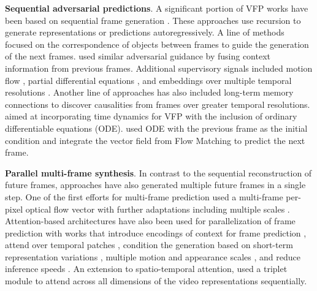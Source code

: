 \documentclass[smallextended,twocolumn,natbib]{svjour3}
\begin{document}
\noindent
\textbf{Sequential adversarial predictions}. A significant portion of VFP works have been based on sequential frame generation \citep{castrejon2019improved,chaabane2020looking,chang2021mau,chang2022strpm,chen2017learning,guen2020disentangling,hwang2019adversarial,jin2020exploring,liang2017dual,villegas2018hierarchical,wang2018predrnn++,wu2021motionrnn}. These approaches use recursion to generate representations or predictions autoregressively. A line of methods \citep{chen2017learning,jin2017video} focused on the correspondence of objects between frames to guide the generation of the next frames. \citet{castrejon2019improved} used similar adversarial guidance by fusing context information from previous frames. Additional supervisory signals included motion flow \citep{liang2017dual}, partial differential equations \citep{guen2020disentangling}, and embeddings over multiple temporal resolutions \citep{gao2022simvp}. Another line of approaches \citep{chang2021mau,villegas2018hierarchical,wang2018predrnn++} has also included long-term memory connections to discover causalities from frames over greater temporal resolutions. \citet{park2021vid} aimed at incorporating time dynamics for VFP with the inclusion of ordinary differentiable equations (ODE). \citet{davtyan2023efficient} used ODE with the previous frame as the initial condition and integrate the vector field from Flow Matching \citep{lipman2022flow} to predict the next frame. 


\noindent
\textbf{Parallel multi-frame synthesis}. In contrast to the sequential reconstruction of future frames, approaches have also generated multiple future frames in a single step.
One of the first efforts for multi-frame prediction \citep{liu2017video} used a multi-frame per-pixel optical flow vector with further adaptations including multiple scales \citep{hu2023dynamic}. Attention-based architectures have also been used for parallelization of frame prediction with works that introduce encodings of context for frame prediction \citep{ye2023unified}, attend over temporal patches \citep{tan2023temporal}, condition the generation based on short-term representation variations \citep{hu2023dynamic,smith2024convolutional}, multiple motion and appearance scales \citep{zhong2023mmvp}, and reduce inference speeds \citep{ye2022vptr,tang2024vmrnn}. An extension to spatio-temporal attention, \citet{nie2024triplet} used a triplet module to attend across all dimensions of the video representations sequentially.
\end{document}
